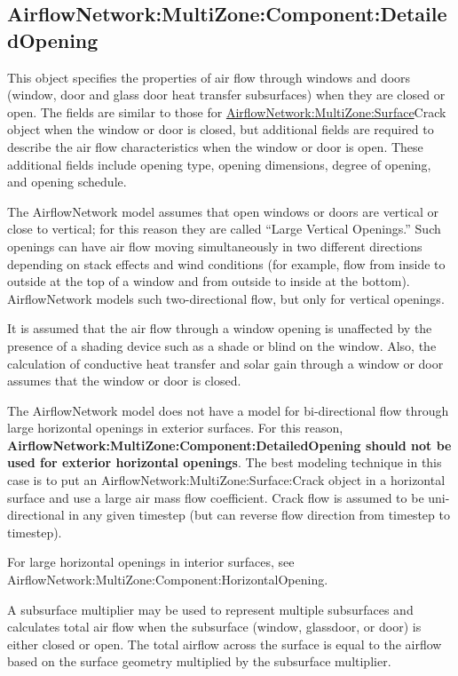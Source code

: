 \subsection{AirflowNetwork:MultiZone:Component:DetailedOpening}\label{airflownetworkmultizonecomponentdetailedopening}

This object specifies the properties of air flow through windows and doors (window, door and glass door heat transfer subsurfaces) when they are closed or open. The fields are similar to those for \hyperref[airflownetworkmultizonesurface]{AirflowNetwork:MultiZone:Surface}Crack object when the window or door is closed, but additional fields are required to describe the air flow characteristics when the window or door is open. These additional fields include opening type, opening dimensions, degree of opening, and opening schedule.

The AirflowNetwork model assumes that open windows or doors are vertical or close to vertical; for this reason they are called ``Large Vertical Openings.'' Such openings can have air flow moving simultaneously in two different directions depending on stack effects and wind conditions (for example, flow from inside to outside at the top of a window and from outside to inside at the bottom). AirflowNetwork models such two-directional flow, but only for vertical openings.

It is assumed that the air flow through a window opening is unaffected by the presence of a shading device such as a shade or blind on the window. Also, the calculation of conductive heat transfer and solar gain through a window or door assumes that the window or door is closed.

The AirflowNetwork model does not have a model for bi-directional flow through large horizontal openings in exterior surfaces. For this reason, \textbf{Air\-flow\-Net\-work:\-Multi\-Zone:\-Component:\-Detailed\-Opening should not be used for exterior horizontal openings}. The best modeling technique in this case is to put an Air\-flow\-Net\-work:\-Multi\-Zone:\-Sur\-face:\-Crack object in a horizontal surface and use a large air mass flow coefficient. Crack flow is assumed to be uni-directional in any given timestep (but can reverse flow direction from timestep to timestep).

For large horizontal openings in interior surfaces, see Air\-flow\-Net\-work:\-Multi\-Zone:\-Component:\-Horizontal\-Opening.

A subsurface multiplier may be used to represent multiple subsurfaces and calculates total air flow when the subsurface (window, glassdoor, or door) is either closed or open. The total airflow across the surface is equal to the airflow based on the surface geometry multiplied by the subsurface multiplier.

